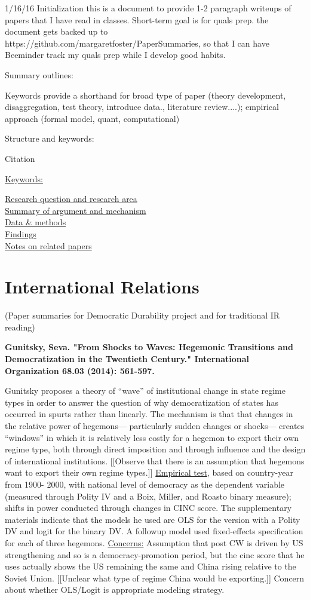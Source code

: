 \documentclass{article}[12pt]
\begin{document}
1/16/16 Initialization
this is a document to provide 1-2 paragraph writeups of papers that I have read in classes. Short-term goal is for quals prep.
the document gets backed up to \\
https://github.com/margaretfoster/PaperSummaries, so that I can have Beeminder track my quals prep 
while I develop good habits.

Summary outlines:

Keywords provide a shorthand for broad type of paper (theory development, disaggregation, test theory, introduce data., literature review....); empirical approach (formal model, quant, computational)

Structure and keywords:

Citation

\underline{Keywords:}

\underline{Research question and research area}\\
\underline{Summary of argument and mechanism}\\
\underline{Data \& methods}\\
\underline{Findings}\\
\underline{Notes on related papers}\\

\section{International Relations}
(Paper summaries for Democratic Durability project and for traditional IR reading)


\textbf{Gunitsky, Seva. "From Shocks to Waves: Hegemonic Transitions and Democratization in the Twentieth Century." International Organization 68.03 (2014): 561-597.}

Gunitsky proposes a theory of “wave” of institutional change in state regime types in order to answer the question of why democratization of states has occurred in spurts rather than linearly. The mechanism is that that changes in the relative power of hegemons— particularly sudden changes or shocks— creates “windows” in which it is relatively less costly for a hegemon to export their own regime type, both through direct imposition and through influence and the design of international institutions. [[Observe that there is an assumption that hegemons want to export their own regime types.]]
\underline{Empirical test}, based on country-year from 1900- 2000, with national level of democracy as the dependent variable (measured through Polity IV and a Boix, Miller, and Roasto binary measure); shifts in power conducted through changes in CINC score. The supplementary materials indicate that the models he used are OLS for the version with a Polity DV and logit for the binary DV.  A followup model used fixed-effects specification for each of three hegemons.
\underline{Concerns:} Assumption that post CW is driven by US strengthening and so is a democracy-promotion period, but the cinc score that he uses actually shows the US remaining the same and China rising relative to the Soviet Union. [[Unclear what type of regime China would be exporting.]] Concern about whether OLS/Logit is appropriate modeling strategy.
\end{document}
